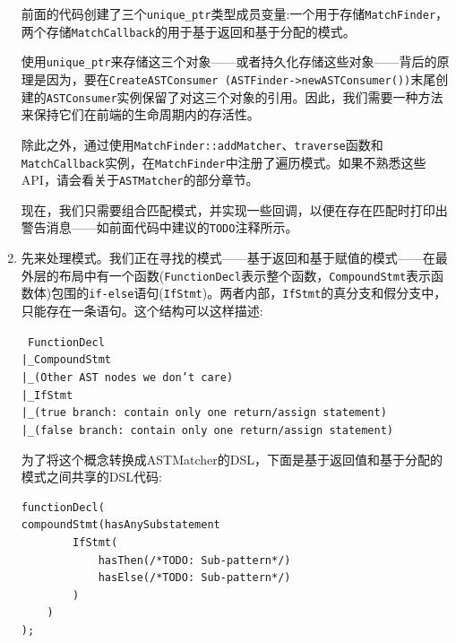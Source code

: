 \begin{enumerate}
前面的代码创建了三个\texttt{unique\_ptr}类型成员变量:一个用于存储\texttt{MatchFinder}，两个存储\texttt{MatchCallback}的用于基于返回和基于分配的模式。

\begin{tcolorbox}[colback=blue!5!white,colframe=blue!75!black, fonttitle=\bfseries,title=为啥使用unique\_ptr?]	\hspace*{0.7cm}使用\texttt{unique\_ptr}来存储这三个对象——或者持久化存储这些对象——背后的原理是因为，要在\texttt{CreateASTConsumer (ASTFinder->newASTConsumer())}末尾创建的\texttt{ASTConsumer}实例保留了对这三个对象的引用。因此，我们需要一种方法来保持它们在前端的生命周期内的存活性。
\end{tcolorbox}

除此之外，通过使用\texttt{MatchFinder::addMatcher}、\texttt{traverse}函数和\texttt{MatchCallback}实例，在\texttt{MatchFinder}中注册了遍历模式。如果不熟悉这些API，请会看关于\texttt{ASTMatcher}的部分章节。

现在，我们只需要组合匹配模式，并实现一些回调，以便在存在匹配时打印出警告消息——如前面代码中建议的\texttt{TODO}注释所示。

\item 先来处理模式。我们正在寻找的模式——基于返回和基于赋值的模式——在最外层的布局中有一个函数(\texttt{FunctionDecl}表示整个函数，\texttt{CompoundStmt}表示函数体)包围的\texttt{if-else}语句(\texttt{IfStmt})。两者内部，\texttt{IfStmt}的真分支和假分支中，只能存在一条语句。这个结构可以这样描述:

\begin{tcolorbox}[colback=white,colframe=black]
\tt
{}
FunctionDecl \\
\hspace*{0.3cm}|\_CompoundStmt \\
\hspace*{0.6cm}|\_(Other AST nodes we don't care) \\
\hspace*{0.6cm}|\_IfStmt \\
\hspace*{0.9cm}|\_(true branch: contain only one return/assign statement) \\
\hspace*{0.9cm}|\_(false branch: contain only one return/assign statement)
\end{tcolorbox}

为了将这个概念转换成ASTMatcher的DSL，下面是基于返回值和基于分配的模式之间共享的DSL代码:

\begin{lstlisting}[style=styleCXX]
functionDecl(
compoundStmt(hasAnySubstatement
		IfStmt(
			hasThen(/*TODO: Sub-pattern*/)
			hasElse(/*TODO: Sub-pattern*/)
		)
	)
);
\end{lstlisting}


\end{enumerate}
